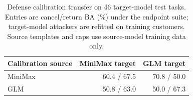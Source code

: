\begin{table}[t]\centering\small
\caption{Defense calibration transfer on 46 target-model test tasks. Entries are cancel/return BA (\%) under the endpoint suite; target-model attackers are refitted on training customers. Source templates and caps use source-model training data only.}\label{tab:calibration-transfer}
\begin{tabular}{@{}lrr@{}}\toprule
Calibration source & MiniMax target & GLM target\\\midrule
MiniMax & 60.4 / 67.5 & 70.8 / 50.0\\
GLM & 50.8 / 63.0 & 50.0 / 67.3\\
\bottomrule\end{tabular}
\end{table}
